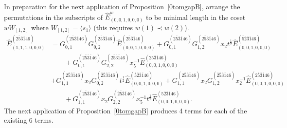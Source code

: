 \documentclass[11pt]{article}
\theoremstyle{plain}
\theoremstyle{definition}
\theoremstyle{remark}
\numberwithin{equation}{section}
\newcounter{r}
\newcounter{s}
\begin{document}
In preparation for the next application of Proposition~\ref{0tomgapB}, 
arrange the permutations in the subscripts of $\widehat{E}^w_{(0,0,1,0,0,0)}$ to be minimal length
in the coset $wW_{[1,2]}$ where $W_{[1,2]} = \langle s_1\rangle$ (this requires $w(1)\prec w(2)$).
\begin{align*}
\widehat{E}^{(2\overline{5}\overline{3}\overline{1}46)}_{(1,1,1,0,0,0)}
&=G_{0,1}^{(2\overline{5}\overline{3}\overline{1}46)}
G_{0,2}^{(2\overline{5}\overline{3}\overline{1}46)}\widehat{E}^{(2\overline{5}\overline{3}\overline{1}46)}_{(0,0,1,0,0,0)}
+G_{0,1}^{(2\overline{5}\overline{3}\overline{1}46)}
G_{1,2}^{(2\overline{5}\overline{3}\overline{1}46)}x_2
t^{\frac{1}{2}} \widehat{E}^{(\overline{5}\overline{2}\overline{3}\overline{1}46)}_{(0,0,1,0,0,0)}
\\
&\qquad
+G_{0,1}^{(2\overline{5}\overline{3}\overline{1}46)}
G_{2,2}^{(2\overline{5}\overline{3}\overline{1}46)}x_5^{-1}
\widehat{E}^{(25\overline{3}\overline{1}46)}_{(0,0,1,0,0,0)}
\\
&+G_{1,1}^{(2\overline{5}\overline{3}\overline{1}46)} x_2
G_{0,2}^{(\overline{2}\overline{5}\overline{3}\overline{1}46)}
t^{\frac{1}{2}}\widehat{E}^{(\overline{5}\overline{2}\overline{3}\overline{1}46)}_{(0,0,1,0,0,0)}
+G_{1,1}^{(2\overline{5}\overline{3}\overline{1}46)} x_2
G_{1,2}^{(\overline{2}\overline{5}\overline{3}\overline{1}46)} x_2^{-1} 
\widehat{E}^{(2\overline{5}\overline{3}\overline{1}46)}_{(0,0,1,0,0,0)}
\\
&\qquad
+G_{1,1}^{(2\overline{5}\overline{3}\overline{1}46)} x_2
G_{2,2}^{(\overline{2}\overline{5}\overline{3}\overline{1}46)} x_5^{-1} 
t^{\frac{1}{2}}\widehat{E}^{(5\overline{2}\overline{3}\overline{1}46)}_{(0,0,1,0,0,0)}.
\end{align*}
The next application of Proposition~\ref{0tomgapB} produces 4 terms for each of the existing 6 terms.
\end{document}

